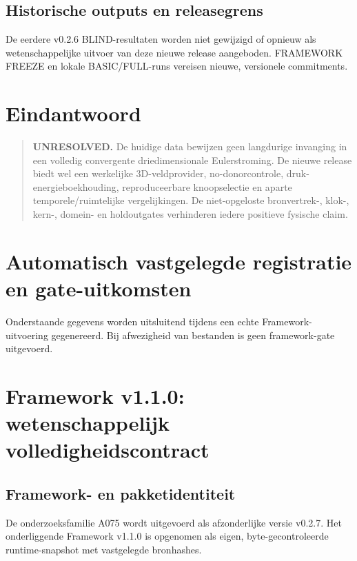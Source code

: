 \documentclass[10pt,a4paper]{article}
\begin{document}
\subsection{Historische outputs en releasegrens}
De eerdere v0.2.6 BLIND-resultaten worden niet gewijzigd of opnieuw als
wetenschappelijke uitvoer van deze nieuwe release aangeboden. FRAMEWORK
FREEZE en lokale BASIC/FULL-runs vereisen nieuwe, versionele commitments.

\section{Eindantwoord}
\begin{quote}\textbf{UNRESOLVED.} De huidige data bewijzen geen langdurige invanging in een volledig convergente driedimensionale Eulerstroming. De nieuwe release biedt wel een werkelijke 3D-veldprovider, no-donorcontrole, druk-energieboekhouding, reproduceerbare knoopselectie en aparte temporele/ruimtelijke vergelijkingen. De niet-opgeloste bronvertrek-, klok-, kern-, domein- en holdoutgates verhinderen iedere positieve fysische claim.\end{quote}
\section{Automatisch vastgelegde registratie en gate-uitkomsten}
Onderstaande gegevens worden uitsluitend tijdens een echte Framework-uitvoering gegenereerd.
Bij afwezigheid van bestanden is geen framework-gate uitgevoerd.

\section{Framework v1.1.0: wetenschappelijk volledigheidscontract}
\subsection{Framework- en pakketidentiteit}
De onderzoeksfamilie A075 wordt uitgevoerd als afzonderlijke versie v0.2.7. Het onderliggende Framework v1.1.0 is opgenomen als eigen, byte-gecontroleerde runtime-snapshot met vastgelegde bronhashes.
\end{document}
